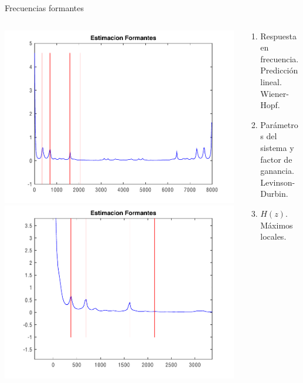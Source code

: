 \documentclass{beamer}
\begin{document}
\begin{frame}{Frecuencias formantes}

\begin{columns}
\begin{column}{0.5\linewidth}
\includegraphics[width=\linewidth]{Formantes} \hfill
\includegraphics[width=\linewidth]{Formantes2}
\end{column}
\begin{column}{0.5\linewidth}
\begin{enumerate}
\item Respuesta en frecuencia. Predicción lineal. Wiener-Hopf.
\item Parámetros del sistema y factor de ganancia. Levinson-Durbin.
\item $H(z)$. Máximos locales.
\end{enumerate}
\end{column}
\end{columns}

\end{frame}
\end{document}
